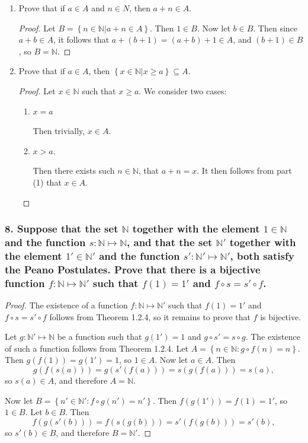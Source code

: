 \documentclass{article}
\newcommand{\N}{\mathbb{N}}
\begin{document}
	\begin{enumerate}
		\item[(1)] Prove that if $a \in A$ and $n \in N$, then $a + n \in A$.
		
		\begin{proof}
			Let $B = \left\{n \in \N | a + n \in A\right\}$. Then $1 \in B$. Now let $b \in B$. Then since $a + b \in A$, it follows that $a + (b + 1) = (a + b) + 1 \in A$, and $(b + 1) \in B$, so $B = \N$.
		\end{proof}
		
		\item[(2)] Prove that if $a \in A$, then $\left\{x \in \N | x \ge a\right\} \subseteq A$. 
		
		\begin{proof}
			Let $x \in \N$ such that $x \ge a$. We consider two cases:

			\begin{enumerate}
				\item[Case 1:] $x = a$
				
				Then trivially, $x \in A$.

				\item[Case 2:] $x > a$.
				
				Then there exists such $n \in \N$, that $a + n = x$. It then follows from part (1) that $x \in A$.
			\end{enumerate}
		\end{proof}
	\end{enumerate}

\subsubsection*{8. Suppose that the set $\N$ together with the element $1 \in \N$ and the function $s: \N \mapsto \N$, and that the set $\N'$ together with the element $1' \in \N'$ and the function $s':\N'\mapsto\N'$, both satisfy the Peano Postulates. Prove that there is a bijective function $f: \N \mapsto \N'$ such that $f(1) = 1'$ and $f\circ s = s'\circ f$.}

\begin{proof}
	The existence of a function $f: \N \mapsto \N'$ such that $f(1) = 1'$ and $f\circ s = s'\circ f$ follows from Theorem 1.2.4, so it remains to prove that $f$ is bijective.

	Let $g: \N' \mapsto \N$ be a function such that $g(1') = 1$ and $g \circ s' = s \circ g$. The existence of such a function follows from Theorem 1.2.4. Let $A = \left\{n \in \N: g \circ f(n) = n \right\}$. Then $g(f(1)) = g(1') = 1$, so $1 \in A$. Now let $a \in A$. Then \[ g(f(s(a))) = g(s'(f(a))) = s(g(f(a))) = s(a), \] so $s(a) \in A$, and therefore $A = \N$.

	Now let $B = \left\{n' \in \N': f \circ g(n') = n'\right\}$. Then $f(g(1')) = f(1) = 1'$, so $1 \in B$. Let $b \in B$. Then \[ f(g(s'(b))) = f(s(g(b))) = s'(f(g(b))) = s'(b), \] so $s'(b) \in B$, and therefore $B = \N'$.
\end{proof}
\end{document}
